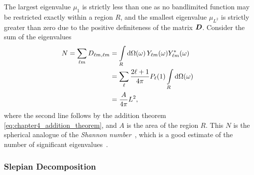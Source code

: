 %
The largest eigenvalue \(\mu_{1}\) is strictly less than one as no bandlimited function may be restricted exactly within a region \(R\), and the smallest eigenvalue \(\mu_{L^{2}}\) is strictly greater than zero due to the positive definiteness of the matrix \(\vb*{D}\).
Consider the sum of the eigenvalues
%
\begin{align}\label{eq:chapter4_shannon}
	N
	= \sum\limits_{\ell m} D_{\ell m,\ell m}
	 & = \int\limits_{R} \dd{\Omega(\omega)} {Y}_{\ell m}(\omega) {Y}_{\ell m}^{\ast}(\omega) \nonumber \\
	 & = \sum\limits_{\ell} \frac{2\ell+1}{4\pi} P_{\ell}(1) \int\limits_{R} \dd{\Omega(\omega)} \nonumber           \\
	 & = \frac{A}{4\pi} L^{2},
\end{align}
%
where the second line follows by the addition theorem \cref{eq:chapter4_addition_theorem}, and \(A\) is the area of the region \(R\).
This \(N\) is the spherical analogue of the \emph{Shannon number}~\autocite{Simons2006}, which is a good estimate of the number of significant eigenvalues~\autocite{Percival1993}.

\subsubsection{Slepian Decomposition}

